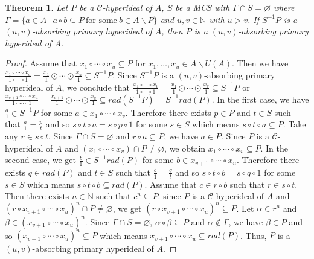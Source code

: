 \documentclass[preprint,review,10pt]{amsart}
\newtheorem{theorem}{Theorem}[section]
\theoremstyle{definition}
\theoremstyle{remark}
\numberwithin{equation}{section}
\begin{document}
\begin{theorem}
Let $P$ be a $\mathcal{C}$-hyperideal of $A$, $S$ be a MCS with $\Gamma \cap S = \varnothing$ where $\Gamma=\{a \in A \ \vert \ a \circ b \subseteq P \  \text{for some} \ b \in A \backslash P\}$ and $u,v \in \mathbb{N}$ with $u >v$. If $S^{-1}P$ is a $(u, v)$-absorbing primary hyperideal of $A$, then $P$ is a $(u,v )$-absorbing primary hyperideal of $ A$. 
\end{theorem}
\begin{proof}
Assume that $x_1 \circ \cdots \circ x_u \subseteq P$ for $x_1,\ldots,x_u \in A \backslash U(A)$. Then we have $\frac{x_1 \circ \cdots \circ x_u}{1 \circ \cdots \circ 1}= \frac{x_1}{1}\odot \cdots \odot \frac{x_u}{1}\subseteq S^{-1}P$. Since $S^{-1}P$ is a $(u, v)$-absorbing primary hyperideal of $A$, we conclude that $\frac{x_1 \circ \cdots \circ x_v}{1 \circ \cdots \circ 1}=\frac{x_1}{1}\odot \cdots \odot \frac{x_v}{1}  \subseteq S^{-1}P$ or $\frac{x_{v+1} \circ \cdots \circ x_u}{1 \circ \cdots \circ 1}=\frac{x_{v+1}}{1}\odot \cdots \odot \frac{x_u}{1}  \subseteq rad(S^{-1}P)=S^{-1}rad(P)$. In the first case, we have $\frac{a}{1} \in S^{-1}P$ for some $a \in x_1 \circ \cdots \circ x_v$. Therefore there exists $p \in P$ and $t \in S$ such that $\frac{a}{1}=\frac{p}{t}$ and so $s \circ t \circ a=s \circ p \circ 1$ for some $s \in S$ which means $s \circ t \circ a \subseteq P$. Take any $r \in s \circ t$.  Since $\Gamma \cap S=\varnothing$ and $r \circ a \subseteq P$, we have $a \in P$. Since $P$ is a $\mathcal{C}$-hyperideal of $A$ and $(x_1 \circ \cdots \circ x_v) \cap P \neq \varnothing$, we obtain $x_1 \circ \cdots \circ x_v \subseteq  P$. In the second case, we get $\frac{b}{1} \in S^{-1}rad(P)$ for some $b \in x_{v+1} \circ \cdots \circ x_u$. Therefore there exists $q \in rad(P)$ and $t \in S$ such that $\frac{b}{1}=\frac{q}{t}$ and so $s \circ t \circ b=s \circ q \circ 1$ for some $s \in S$ which means $s \circ t \circ b \subseteq rad(P)$. Assume that $c \in r \circ b$ such that $r \in s \circ t$. Then there exists $n \in \mathbb{N}$ such that $c^n \subseteq P$. since $P$ is a $\mathcal{C}$-hyperideal of $A$ and $ (r \circ x_{v+1} \circ \cdots \circ x_u)^n \cap P \neq \varnothing$, we get $(r \circ x_{v+1} \circ \cdots \circ x_u)^n \subseteq P$. Let $\alpha \in r^n$ and $\beta \in  (x_{v+1} \circ \cdots \circ x_u)^n$. Since $\Gamma \cap S=\varnothing$, $\alpha \circ \beta \subseteq P$ and $\alpha \notin \Gamma$, we have $\beta \in P$ and so $(x_{v+1} \circ \cdots \circ x_u)^n \subseteq P$ which means $x_{v+1} \circ \cdots \circ x_u \subseteq rad(P)$. Thus, $P$ is a $(u,v )$-absorbing primary hyperideal of $ A$.
\end{proof}
\end{document}

